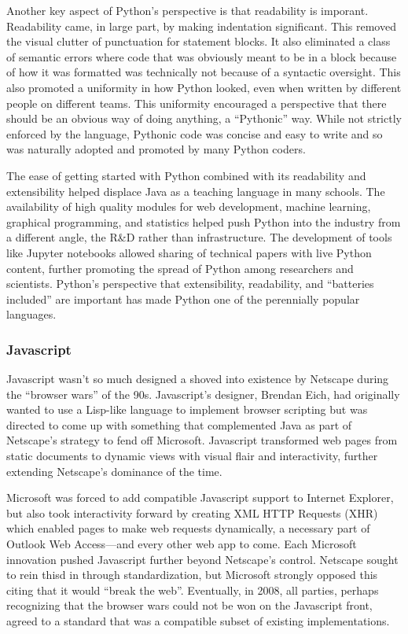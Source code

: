 Another key aspect of Python's perspective is that readability is imporant.
Readability came, in large part, by making indentation significant. This
removed the visual clutter of punctuation for statement blocks. It also
eliminated a class of semantic errors where code that was obviously meant to be
in a block because of how it was formatted was technically not because of a
syntactic oversight. This also promoted a uniformity in how Python looked, even
when written by different people on different teams. This uniformity encouraged
a perspective that there should be an obvious way of doing anything, a
``Pythonic'' way. While not strictly enforced by the language, Pythonic code
was concise and easy to write and so was naturally adopted and promoted by many
Python coders.

The ease of getting started with Python combined with its readability and
extensibility helped displace Java as a teaching language in many schools. The
availability of high quality modules for web development, machine learning,
graphical programming, and statistics helped push Python into the industry from
a different angle, the R\&D rather than infrastructure. The development of
tools like Jupyter notebooks allowed sharing of technical papers with live
Python content, further promoting the spread of Python among researchers and
scientists.  Python's perspective that extensibility, readability, and
``batteries included'' are important has made Python one of the perennially
popular languages.

\subsubsection{Javascript}

Javascript wasn't so much designed a shoved into existence by Netscape during
the ``browser wars'' of the 90s. Javascript's designer, Brendan Eich, had
originally wanted to use a Lisp-like language to implement browser scripting but
was directed to come up with something that complemented Java as part of
Netscape's strategy to fend off Microsoft. Javascript transformed web pages
from static documents to dynamic views with visual flair and interactivity,
further extending Netscape's dominance of the time.

Microsoft was forced to add compatible Javascript support to Internet Explorer,
but also took interactivity forward by creating XML HTTP Requests (XHR) which
enabled pages to make web requests dynamically, a necessary part of Outlook Web
Access---and every other web app to come. Each Microsoft innovation pushed
Javascript further beyond Netscape's control. Netscape sought to rein thisd in
through standardization, but Microsoft strongly opposed this citing that it
would ``break the web''. Eventually, in 2008, all parties, perhaps recognizing
that the browser wars could not be won on the Javascript front, agreed to a
standard that was a compatible subset of existing implementations.

